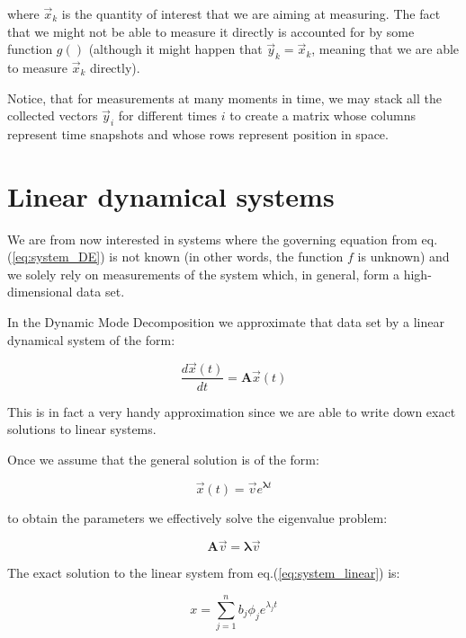 \documentclass[10pt,twocolumn]{article}
\begin{document}
where $\vec{x}_k$ is the quantity of interest that we are aiming at measuring. The fact that we might not be able to measure it directly is accounted for by some function $g()$ (although it might happen that $\vec{y}_k = \vec{x}_k$, meaning that we are able to measure $\vec{x}_k$ directly).

Notice, that for measurements at many moments in time, we may stack all the collected vectors $\vec{y}_i$ for different times $i$ to create a matrix whose columns represent time snapshots and whose rows represent position in space.

\section{Linear dynamical systems}

We are from now interested in systems where the governing equation from eq.(\ref{eq:system_DE}) is not known (in other words, the function $f$ is unknown) and we solely rely on measurements of the system which, in general, form a high-dimensional data set.

In the Dynamic Mode Decomposition we approximate that data set by a linear dynamical system of the form:

\begin{equation} \label{eq:system_linear}
\frac{d \vec{x}(t)}{dt} = \bm{A} \vec{x}(t)
\end{equation}

This is in fact a very handy approximation since we are able to write down exact solutions to linear systems.

Once we assume that the general solution is of the form:

\begin{equation} \label{eq:general_solution}
\vec{x}(t) = \vec{v} e^{\bm{\lambda} t}
\end{equation}

to obtain the parameters we effectively solve the eigenvalue problem:

\begin{equation} \label{eq:eigenvalue_solution}
\bm{A} \vec{v} = \bm{\lambda} \vec{v}
\end{equation}

The exact solution to the linear system from eq.(\ref{eq:system_linear}) is:

\begin{equation} \label{eq:soln_exact}
x = \sum_{j = 1}^{n} b_j \phi_j e^{\lambda_j t}
\end{equation}
\end{document}
